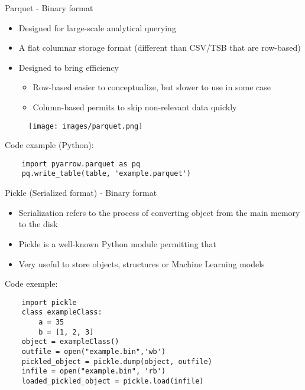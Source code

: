 \documentclass[handout]{beamer}[10pt, usepdftitle=false]
\begin{document}
	\begin{frame}[fragile]
	Parquet - Binary format
	\vspace*{0.6em}
	
	\begin{itemize}
		\item{Designed for large-scale analytical querying}
		\item{A flat columnar storage format (different than CSV/TSB that are row-based)}
		\item{Designed to bring efficiency
			\begin{itemize}
				\item{Row-based easier to conceptualize, but slower to use in some case}
				\item{Column-based permits to skip non-relevant data quickly} 
			\end{itemize}					
		}
	\end{itemize}
			
	\begin{center}	
	\begin{figure}
		\texttt{[image: images/parquet.png]} 
	\end{figure}	
	\end{center}
	
	Code example (Python):
	\begin{verbatim}
	import pyarrow.parquet as pq
	pq.write_table(table, 'example.parquet')	
	\end{verbatim}
	
	\end{frame}
	\begin{frame}[fragile]	
	Pickle (Serialized format) - Binary format
		
	\vspace*{0.6em}
	\begin{itemize}
		\item{Serialization refers to the process of converting object from the main memory to the disk}
		\item{Pickle is a well-known Python module permitting that}
		\item{Very useful to store objects, structures or Machine Learning models}
	\end{itemize}		
	
	Code exemple:
	\begin{verbatim}
	import pickle
	class exampleClass:
    	a = 35
    	b = [1, 2, 3]
	object = exampleClass()
	outfile = open("example.bin",'wb')
	pickled_object = pickle.dump(object, outfile) 
	infile = open("example.bin", 'rb')
	loaded_pickled_object = pickle.load(infile)
	\end{verbatim}
		
	\end{frame}
\end{document}
